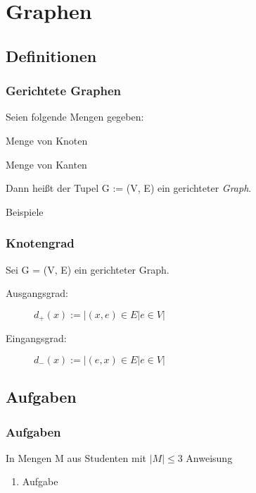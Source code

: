 \section{Graphen}
\subsection{Definitionen}
\begin{frame}
  \frametitle{Gerichtete Graphen}
  \begin{definition}
    \begin{description}{Seien folgende Mengen gegeben:}
      \item[V:] Menge von Knoten
      \item[$E \subset V \times V$:] Menge von Kanten
    \end{description}
    Dann heißt der Tupel G := (V, E) ein gerichteter \emph{Graph}.
  \end{definition}\pause
  \begin{exampleblock}{Beispiele}
    \begin{itemize}
    \end{itemize}
  \end{exampleblock}
\end{frame}
\begin{frame}
  \frametitle{Knotengrad}
  \begin{definition}
    Sei G = (V, E) ein gerichteter Graph.
    \begin{description}
      \item[Ausgangsgrad:] $d_+(x) := |{(x, e) \in E | e \in V}|$
      \item[Eingangsgrad:] $d_-(x) := |{(e, x) \in E | e \in V}|$
    \end{description}
  \end{definition}\pause
\end{frame}

\subsection{Aufgaben}
\begin{frame}
  \frametitle{Aufgaben}
  \begin{exampleblock}{In Mengen M aus Studenten mit $|M| \leq 3$}
      Anweisung
      \begin{enumerate}
        \item Aufgabe
      \end{enumerate}
  \end{exampleblock}
\end{frame}
